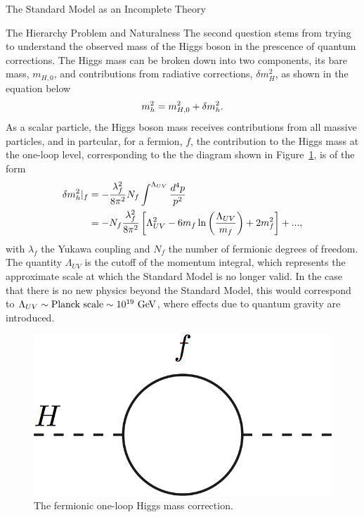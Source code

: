 \begin{section}{The Standard Model as an Incomplete Theory}
\begin{subsection}{The Hierarchy Problem and Naturalness}
The second question stems from trying to understand the observed mass of the Higgs boson in the prescence of quantum corrections.
The Higgs mass can be broken down into two components, its bare mass, $m_{H,0}$, and contributions from radiative corrections, $\delta m_H^2$, as shown in the equation below
\begin{align}
m_{h}^2 = m_{H,0}^2 + \delta m_{h}^2.
\end{align}
As a scalar particle, the Higgs boson mass receives contributions from all massive particles, and in partcular, for a fermion, $f$, the contribution to the Higgs mass at the one-loop level, corresponding to the the diagram shown in Figure~\ref{fig:higgs_fermion_loop}, is of the form
\begin{align}
\delta m_{h}^2|_f &= -\frac{\lambda^2_f}{8\pi^2}N_f \int^{\Lambda_{UV}} \frac{d^4p}{p^2} \nonumber \\
                &= -N_f\frac{\lambda^2_f}{8\pi^2 } \left[\Lambda^2_{UV} - 6m_f\ln\left(\frac{\Lambda_{UV}}{m_f}\right) + 2m_f^2\right] + ...,
\end{align}
with $\lambda_f$ the Yukawa coupling and $N_f$ the number of fermionic degrees of freedom.
The quantity $\Lambda_{UV}$ is the cutoff of the momentum integral, which represents the approximate scale at which the Standard Model is no longer valid.
In the case that there is no new physics beyond the Standard Model, this would correspond to $\Lambda_{UV} \sim \text{Planck scale} \sim 10^{19}~\mathrm{Ge\kern -0.1em V}$, where effects due to quantum gravity are introduced.

\begin{figure}[tbp!]
\begin{center}
\includegraphics[angle=0,width=0.40\columnwidth]{fig/higgs_fermion_loop.png}
\end{center}
\caption{The fermionic one-loop Higgs mass correction.}
\label{fig:higgs_fermion_loop}
\end{figure}


\end{subsection}
\end{section}
